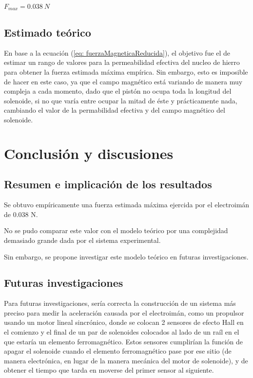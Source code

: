 \documentclass[a4paper,12pt]{article}
\begin{document}
        $F_{max} = 0.038 \ N$

    \subsection*{Estimado teórico}

        En base a la ecuación (\ref{eq: fuerzaMagneticaReducida}), el objetivo fue el de estimar un rango de valores para la permeabilidad efectiva del nucleo de hierro para obtener la fuerza estimada máxima empírica. Sin embargo, esto es imposible de hacer en este caso, ya que el campo magnético está variando de manera muy compleja a cada momento, dado que el pistón no ocupa toda la longitud del solenoide, si no que varía entre ocupar la mitad de éste y prácticamente nada, cambiando el valor de la permabilidad efectiva y del campo magnético del solenoide.

\section*{Conclusión y discusiones}

    \subsection*{Resumen e implicación de los resultados}

        Se obtuvo empíricamente una fuerza estimada máxima ejercida por el electroimán de 0.038 N.
        
        No se pudo comparar este valor con el modelo teórico por una complejidad demasiado grande dada por el sistema experimental.

        Sin embargo, se propone investigar este modelo teórico en futuras investigaciones.

    \subsection*{Futuras investigaciones}

        Para futuras investigaciones, sería correcta la construcción de un sistema más preciso para medir la aceleración causada por el electroimán, como un propulsor usando un motor lineal sincrónico, donde se colocan 2 sensores de efecto Hall en el comienzo y el final de un par de solenoides colocados al lado de un raíl en el que estaría un elemento ferromagnético. Estos sensores cumplirían la función de apagar el solenoide cuando el elemento ferromagnético pase por ese sitio (de manera electrónica, en lugar de la manera mecánica del motor de solenoide), y de obtener el tiempo que tarda en moverse del primer sensor al siguiente.
\end{document}

